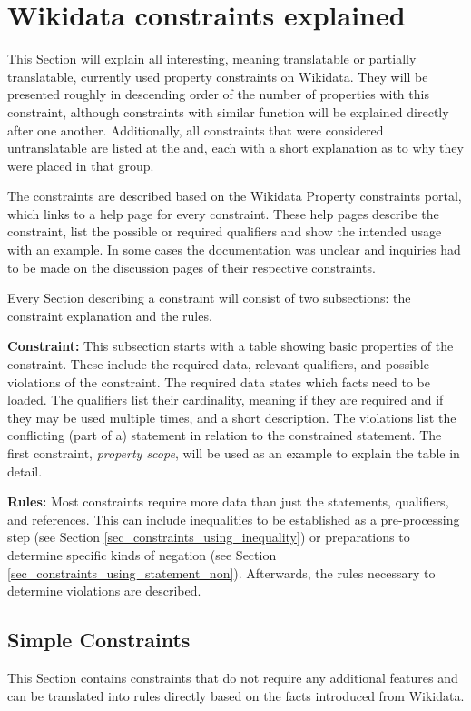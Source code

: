 \documentclass[hyperref,bachelorofscience,fleqn]{cgvpub}
\begin{document}
\chapter{Wikidata constraints explained}\label{cha_wikidata_constraints_explained}
This Section will explain all interesting, meaning translatable or partially translatable, currently used property constraints on Wikidata. They will be presented roughly in descending order of the number of properties with this constraint, although constraints with similar function will be explained directly after one another. Additionally, all constraints that were considered untranslatable are listed at the and, each with a short explanation as to why they were placed in that group.

The constraints are described based on the Wikidata Property constraints portal\cite{constraintsPortal}, which links to a help page for every constraint. These help pages describe the constraint, list the possible or required qualifiers and show the intended usage with an example. In some cases the documentation was unclear and inquiries had to be made on the discussion pages of their respective constraints.

Every Section describing a constraint will consist of two subsections: the constraint explanation and the rules.

{\bf Constraint:} This subsection starts with a table showing basic properties of the constraint. These include the required data, relevant qualifiers, and possible violations of the constraint. The required data states which facts need to be loaded. The qualifiers list their cardinality, meaning if they are required and if they may be used multiple times, and a short description. The violations list the conflicting (part of a) statement in relation to the constrained statement. The first constraint, \emph{property scope}, will be used as an example to explain the table in detail.

{\bf Rules:} Most constraints require more data than just the statements, qualifiers, and references. This can include inequalities to be established as a pre-processing step (see Section \ref{sec_constraints_using_inequality}) or preparations to determine specific kinds of negation (see Section \ref{sec_constraints_using_statement_non}). Afterwards, the rules necessary to determine violations are described.

\section{Simple Constraints}\label{sec_simple_constraints}
This Section contains constraints that do not require any additional features and can be translated into rules directly based on the facts introduced from Wikidata.
\end{document}
